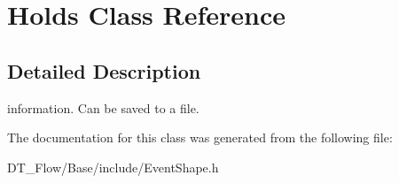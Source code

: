 \hypertarget{classHolds}{}\section{Holds Class Reference}
\label{classHolds}


\subsection{Detailed Description}
information. Can be saved to a file. 

The documentation for this class was generated from the following file\+:\begin{DoxyCompactItemize}
\item 
D\+T\+\_\+\+Flow/\+Base/include/Event\+Shape.\+h\end{DoxyCompactItemize}
